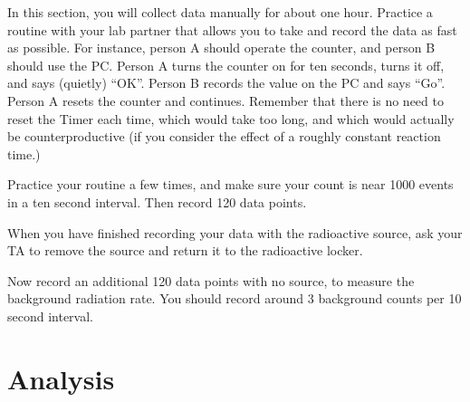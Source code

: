 In this section, you will collect data manually for about one hour.
Practice a routine with your lab partner that allows you to take and
record the data as fast as possible.  For instance, person A should
operate the counter, and person B should use the PC.  Person A turns
the counter on for ten seconds, turns it off, and says (quietly)
``OK''.  Person B records the value on the PC and says ``Go''.  Person
A resets the counter and continues.  Remember that there is no need to
reset the Timer each time, which would take too long, and which would
actually be counterproductive (if you consider the effect of a roughly
constant reaction time.) 

Practice your routine a few times, and make sure your count is near 1000 events in
a ten second interval.  Then record 120 data points.

When you have finished recording your data with the radioactive
source, ask your TA to remove the source and return it to the
radioactive locker.

Now record an additional 120 data points with no source, to measure
the background radiation rate.  You should record around 3 background
counts per 10 second interval.

\section{Analysis}

